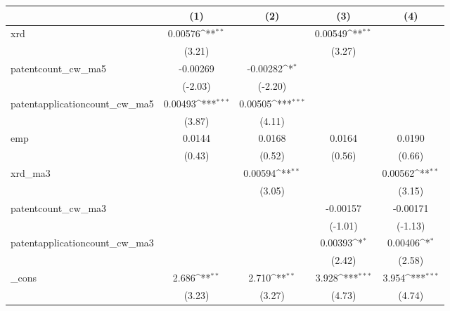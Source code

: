 {
\def\sym#1{\ifmmode^{#1}\else\(^{#1}\)\fi}
\begin{tabular}{l*{4}{c}}
\hline\hline
            &\multicolumn{1}{c}{(1)}         &\multicolumn{1}{c}{(2)}         &\multicolumn{1}{c}{(3)}         &\multicolumn{1}{c}{(4)}         \\
\hline
xrd         &     0.00576\sym{**} &                     &     0.00549\sym{**} &                     \\
            &      (3.21)         &                     &      (3.27)         &                     \\
[1em]
patentcount\_cw\_ma5&    -0.00269         &    -0.00282\sym{*}  &                     &                     \\
            &     (-2.03)         &     (-2.20)         &                     &                     \\
[1em]
patentapplicationcount\_cw\_ma5&     0.00493\sym{***}&     0.00505\sym{***}&                     &                     \\
            &      (3.87)         &      (4.11)         &                     &                     \\
[1em]
emp         &      0.0144         &      0.0168         &      0.0164         &      0.0190         \\
            &      (0.43)         &      (0.52)         &      (0.56)         &      (0.66)         \\
[1em]
xrd\_ma3     &                     &     0.00594\sym{**} &                     &     0.00562\sym{**} \\
            &                     &      (3.05)         &                     &      (3.15)         \\
[1em]
patentcount\_cw\_ma3&                     &                     &    -0.00157         &    -0.00171         \\
            &                     &                     &     (-1.01)         &     (-1.13)         \\
[1em]
patentapplicationcount\_cw\_ma3&                     &                     &     0.00393\sym{*}  &     0.00406\sym{*}  \\
            &                     &                     &      (2.42)         &      (2.58)         \\
[1em]
\_cons      &       2.686\sym{**} &       2.710\sym{**} &       3.928\sym{***}&       3.954\sym{***}\\
            &      (3.23)         &      (3.27)         &      (4.73)         &      (4.74)         \\

\end{tabular}}
